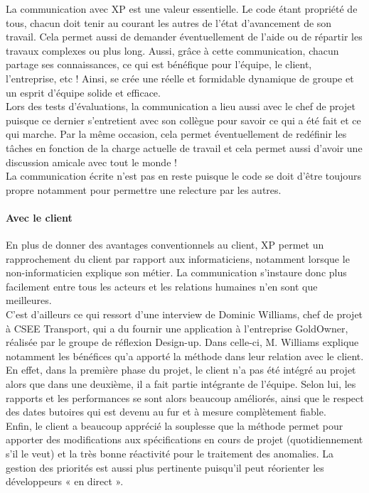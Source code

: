 \documentclass[]{article}
\let\oldparagraph\paragraph
\renewcommand{\paragraph}[1]{\oldparagraph{#1}\mbox{}}
\begin{document}
La communication avec XP est une valeur essentielle. Le code étant
propriété de tous, chacun doit tenir au courant les autres de l'état
d'avancement de son travail. Cela permet aussi de demander
éventuellement de l'aide ou de répartir les travaux complexes ou plus
long. Aussi, grâce à cette communication, chacun partage ses
connaissances, ce qui est bénéfique pour l'équipe, le client,
l'entreprise, etc ! Ainsi, se crée une réelle et formidable dynamique de
groupe et un esprit d'équipe solide et efficace.\\
Lors des tests d'évaluations, la communication a lieu aussi avec le chef
de projet puisque ce dernier s'entretient avec son collègue pour savoir
ce qui a été fait et ce qui marche. Par la même occasion, cela permet
éventuellement de redéfinir les tâches en fonction de la charge actuelle
de travail et cela permet aussi d'avoir une discussion amicale avec tout
le monde !\\
La communication écrite n'est pas en reste puisque le code se doit
d'être toujours propre notamment pour permettre une relecture par les
autres.


\hypertarget{avec-le-client}{%
\paragraph{Avec le client}\label{avec-le-client}}

En plus de donner des avantages conventionnels au client, XP permet un
rapprochement du client par rapport aux informaticiens, notamment
lorsque le non-informaticien explique son métier. La communication
s'instaure donc plus facilement entre tous les acteurs et les relations
humaines n'en sont que meilleures.\\
C'est d'ailleurs ce qui ressort d'une interview de Dominic Williams,
chef de projet à CSEE Transport, qui a du fournir une application à
l'entreprise GoldOwner, réalisée par le groupe de réflexion Design-up.
Dans celle-ci, M. Williams explique notamment les bénéfices qu'a apporté
la méthode dans leur relation avec le client.\\
En effet, dans la première phase du projet, le client n'a pas été
intégré au projet alors que dans une deuxième, il a fait partie
intégrante de l'équipe. Selon lui, les rapports et les performances se
sont alors beaucoup améliorés, ainsi que le respect des dates butoires
qui est devenu au fur et à mesure complètement fiable.\\
Enfin, le client a beaucoup apprécié la souplesse que la méthode permet
pour apporter des modifications aux spécifications en cours de projet
(quotidiennement s'il le veut) et la très bonne réactivité pour le
traitement des anomalies. La gestion des priorités est aussi plus
pertinente puisqu'il peut réorienter les développeurs « en direct ».
\end{document}
